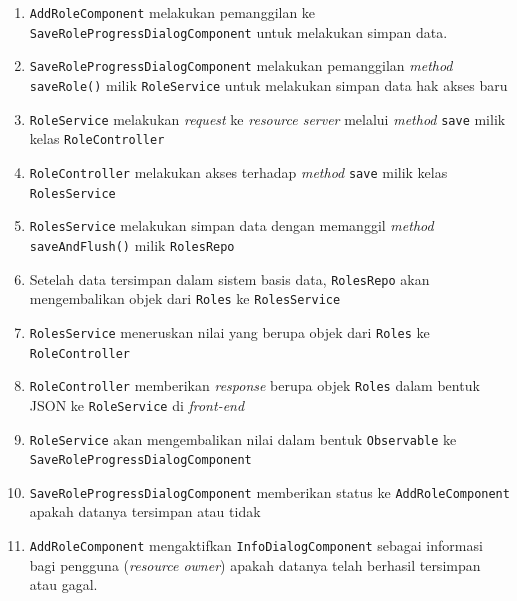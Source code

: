 \documentclass[pdftex,12pt, oneside]{article}
\begin{document}
\begin{itemize}
\begin{enumerate}
		\item \texttt{AddRoleComponent} melakukan pemanggilan ke \texttt{SaveRoleProgressDialogComponent} untuk melakukan simpan data.
		
		\item \texttt{SaveRoleProgressDialogComponent} melakukan pemanggilan \textit{method} \texttt{saveRole()} milik \texttt{RoleService} untuk melakukan simpan data hak akses baru
		
		\item \texttt{RoleService} melakukan \textit{request} ke \textit{resource server} melalui \textit{method} \texttt{save} milik kelas \texttt{RoleController}
		
		\item \texttt{RoleController} melakukan akses terhadap \textit{method} \texttt{save} milik kelas \texttt{RolesService}
		
		\item \texttt{RolesService} melakukan simpan data dengan memanggil \textit{method} \texttt{saveAndFlush()} milik \texttt{RolesRepo}
		
		\item Setelah data tersimpan dalam sistem basis data, \texttt{RolesRepo} akan mengembalikan objek dari \texttt{Roles} ke \texttt{RolesService}
		
		\item \texttt{RolesService} meneruskan nilai yang berupa objek dari \texttt{Roles} ke \texttt{RoleController}
		
		\item \texttt{RoleController} memberikan \textit{response} berupa objek \texttt{Roles} dalam bentuk JSON ke \texttt{RoleService} di \textit{front-end}
		
		\item \texttt{RoleService} akan mengembalikan nilai dalam bentuk \texttt{Observable} ke \texttt{SaveRoleProgressDialogComponent}
		
		\item \texttt{SaveRoleProgressDialogComponent} memberikan status ke \texttt{AddRoleComponent} apakah datanya tersimpan atau tidak
		
		\item \texttt{AddRoleComponent} mengaktifkan \texttt{InfoDialogComponent} sebagai informasi bagi pengguna (\textit{resource owner}) apakah datanya telah berhasil tersimpan atau gagal.
	\end{enumerate}
	

\end{itemize}
\end{document}
